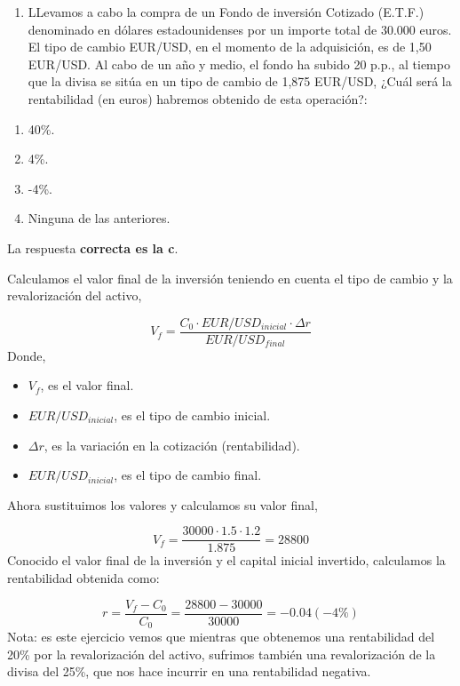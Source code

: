 \documentclass[
  letterpaper,
  DIV=11,
  numbers=noendperiod]{scrreprt}
\providecommand{\tightlist}{%
  \setlength{\itemsep}{0pt}\setlength{\parskip}{0pt}}\usepackage{longtable,booktabs,array}
\begin{document}
\begin{enumerate}
\def\labelenumi{\arabic{enumi}.}
\setcounter{enumi}{26}
\tightlist
\item
  LLevamos a cabo la compra de un Fondo de inversión Cotizado (E.T.F.)
  denominado en dólares estadounidenses por un importe total de 30.000
  euros. El tipo de cambio EUR/USD, en el momento de la adquisición, es
  de 1,50 EUR/USD. Al cabo de un año y medio, el fondo ha subido 20
  p.p., al tiempo que la divisa se sitúa en un tipo de cambio de 1,875
  EUR/USD, ¿Cuál será la rentabilidad (en euros) habremos obtenido de
  esta operación?:
\end{enumerate}

\begin{enumerate}
\def\labelenumi{\alph{enumi})}
\item
  40\%.
\item
  4\%.
\item
  -4\%.
\item
  Ninguna de las anteriores.
\end{enumerate}

\begin{tcolorbox}[enhanced jigsaw, left=2mm, opacityback=0, colback=white, breakable, arc=.35mm, bottomrule=.15mm, rightrule=.15mm, toprule=.15mm, leftrule=.75mm, colframe=quarto-callout-tip-color-frame]
\begin{minipage}[t]{5.5mm}
\textcolor{quarto-callout-tip-color}{\faLightbulb}
\end{minipage}%
\begin{minipage}[t]{\textwidth - 5.5mm}

La respuesta \textbf{correcta es la c}.

Calculamos el valor final de la inversión teniendo en cuenta el tipo de
cambio y la revalorización del activo,

\[V_f=\frac{C_0\cdot{EUR}/{USD}_{inicial}\cdot\Delta r}{{EUR}/{USD}_{final}}\]
Donde,

\begin{itemize}
\item
  \(V_f\), es el valor final.
\item
  \({EUR}/{USD}_{inicial}\), es el tipo de cambio inicial.
\item
  \(\Delta r\), es la variación en la cotización (rentabilidad).
\item
  \({EUR}/{USD}_{inicial}\), es el tipo de cambio final.
\end{itemize}

Ahora sustituimos los valores y calculamos su valor final,

\[V_f=\frac{30000\cdot1.5\cdot1.2}{1.875}=28800\] Conocido el valor
final de la inversión y el capital inicial invertido, calculamos la
rentabilidad obtenida como:

\[r=\frac{V_f-C_0}{C_0}=\frac{28800-30000}{30000}=-0.04\left(-4\%\right)\]
Nota: es este ejercicio vemos que mientras que obtenemos una
rentabilidad del 20\% por la revalorización del activo, sufrimos también
una revalorización de la divisa del 25\%, que nos hace incurrir en una
rentabilidad negativa.

\end{minipage}%
\end{tcolorbox}
\end{document}
